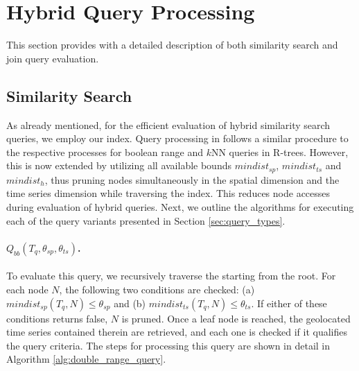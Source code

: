 
\graphicspath{{Papers/SIGSpatial2017/}{Papers/SIGSpatial2018/}}

\section{Hybrid Query Processing}
\label{sec:hybrid_query_processing}
This section provides with a detailed description of both similarity search and join query evaluation.

\subsection{Similarity Search}
As already mentioned, for the efficient evaluation of hybrid similarity search queries, we employ our \btsr index. Query processing in \btsr follows a similar procedure to the respective processes for boolean range \cite{Guttman1984} and $k$NN queries \cite{hjaltason99tods} in R-trees. However, this is now extended by utilizing all available bounds $mindist_{sp}$, $mindist_{ts}$ and $mindist_h$, thus pruning nodes simultaneously in the spatial dimension and the time series dimension while traversing the index. This reduces node accesses during evaluation of hybrid queries. Next, we outline the algorithms for executing each of the query variants presented in Section \ref{sec:query_types}.


\paragraph{$Q_{bb}(T_q, \theta_{sp}, \theta_{ts})$.} To evaluate this query, we recursively traverse the \btsr starting from the root. For each node $N$, the following two conditions are checked: (a) $mindist_{sp}(T_q, N) \leq \theta_{sp}$ and (b) $mindist_{ts}(T_q, N) \leq \theta_{ts}$. If either of these conditions returns false, $N$ is pruned. Once a leaf node is reached, the geolocated time series contained therein are retrieved, and each one is checked if it qualifies the query criteria. The steps for processing this query are shown in detail in Algorithm \ref{alg:double_range_query}.

